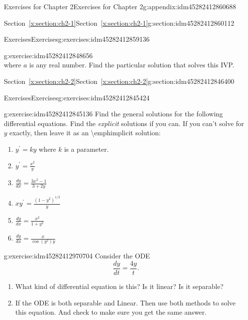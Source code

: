 \documentclass[oneside,10pt,]{book}
\numberwithin{equation}{section}
\numberwithin{equation}{section}
\begin{document}
\begin{appendixptx}{Exercises for Chapter 2}{}{Exercises for Chapter 2}{}{}{g:appendix:idm45282412860688}
\begin{sectionptx}{Section~\ref*{x:section:ch2-1}}{}{Section~\ref*{x:section:ch2-1}}{}{}{g:section:idm45282412860112}
\begin{exercises-subsection-numberless}{Exercises}{}{Exercises}{}{}{g:exercises:idm45282412859136}
\begin{divisionexercise}{3}{}{}{g:exercise:idm45282412848656}
\begin{equation*}
\end{equation*}
where \(a\) is any real number. Find the particular solution that solves this IVP.%
\end{divisionexercise}%
\end{exercises-subsection-numberless}
\end{sectionptx}
%
%
\typeout{************************************************}
\typeout{************************************************}
%
\begin{sectionptx}{Section~\ref*{x:section:ch2-2}}{}{Section~\ref*{x:section:ch2-2}}{}{}{g:section:idm45282412846400}
%
%
\typeout{************************************************}
\typeout{************************************************}
%
\begin{exercises-subsection-numberless}{Exercises}{}{Exercises}{}{}{g:exercises:idm45282412845424}
\begin{divisionexercise}{1}{}{}{g:exercise:idm45282412845136}%
Find the general solutions for the following differential equations. Find the \emph{explicit} solutions if you can. If you can't solve for \(y\) exactly, then leave it as an \textbackslash{}emph\textbraceleft{}implicit\textbraceright{} solution:%
\begin{enumerate}[label=(\alph*)]
\item{}\(y^{\prime}=ky\) where \(k\) is a parameter.%
\item{}\({\displaystyle y^{\prime}=\frac{x^{2}}{y}}\)%
\item{}\({\displaystyle \frac{dy}{dx}=\frac{3x^{2}-1}{3+2y}}\)%
\item{}\(xy^{\prime}=\frac{\left(1-y^{2}\right)^{1/2}}{y}\)%
\item{}\({\displaystyle \frac{dy}{dx}=\frac{x^{2}}{1+y^{2}}}\)%
\item{}\({\displaystyle \frac{dy}{dx}=\frac{x}{\cos\left(y^{2}\right)y}}\)%
\end{enumerate}
%
\end{divisionexercise}%
\begin{divisionexercise}{2}{}{}{g:exercise:idm45282412970704}%
Consider the ODE%
\begin{equation*}
\frac{dy}{dt}=\frac{4y}{t}.
\end{equation*}
%
%
\begin{enumerate}[label=(\alph*)]
\item{}What kind of differential equation is this? Is it linear? Is it separable?%
\item{}If the ODE is both separable and Linear. Then use both methods to solve this equation. And check to make sure you get the same answer.%

\end{enumerate}
\end{divisionexercise}
\end{exercises-subsection-numberless}
\end{sectionptx}
\end{appendixptx}
\end{document}
